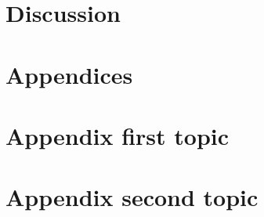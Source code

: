 \documentclass[11pt,twoside]{article}
\numberwithin{Theorem}{section}
\numberwithin{Definition}{section}
\numberwithin{Lemma}{section}
\numberwithin{Algorithm}{section}
\numberwithin{equation}{section}
\begin{document}
\section{Discussion}
\blindtext
\clearpage


\clearpage

\appendix
\section*{Appendices}
\blindtext

\section{Appendix first topic}
\label{app:one}
\blindtext

\section{Appendix second topic}
\label{app:one}
\blindtext
\clearpage
\end{document}
